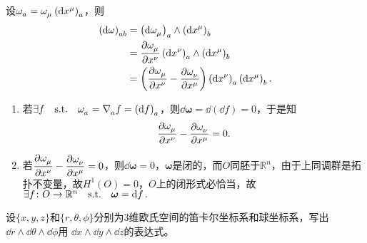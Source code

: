 \begin{xiti}
	\begin{zm}
		设$\tensor{\omega}{_a} = \tensor{\omega}{_\mu} \tensor{\left(\dd{x^\mu}\right)}{_a} $，则
		\begin{align*}
		\tensor{\left(\dd{\omega}\right)}{_{ab}} &= \tensor{\left( \dd{\tensor{\omega}{_\mu}} \right)}{_a} \wedge \tensor{\left(\dd{x^\mu}\right)}{_{b}}\\
		&= \pdv{\tensor{\omega}{_\mu}}{x^\nu} \tensor{\left(\dd{x^\nu}\right)}{_a} \wedge \tensor{\left(\dd{x^\mu}\right)}{_b}\\
		&= \left( \pdv{\tensor{\omega}{_\mu}}{x^\nu} - \pdv{\tensor{\omega}{_\nu}}{x^\mu} \right) \tensor{\left(\dd{x^\nu}\right)}{_a} \tensor{\left(\dd{x^\mu}\right)}{_b}.
		\end{align*}
		\begin{enumerate}
			\item 若$\exists f\qq{s.t.} \tensor{\omega}{_a} = \Nabla{a} f=\tensor{\left(\dd{f}\right)}{_a} $，则$\dd{\bm{\omega}} = \dd(\dd{f})=0 $，于是知\[\pdv{\tensor{\omega}{_\mu}}{x^\nu} - \pdv{\tensor{\omega}{_\nu}}{x^\mu}=0. \]
			\item 若$\displaystyle \pdv{\tensor{\omega}{_\mu}}{x^\nu} - \pdv{\tensor{\omega}{_\nu}}{x^\mu}=0 $，则$\dd{\bm{\omega}}=0 $，$\bm{\omega}$是闭的，而$O$同胚于$\mathbb{R}^n$，由于上同调群是拓扑不变量，故$H^1 (O)={0} $，$O$上的闭形式必恰当，故$\exists f\colon O\rightarrow \mathbb{R}^n \qq{s.t.} \bm{\omega} = \dd{f}. $
		\end{enumerate}
	\end{zm}

	\item 设$ \{ x,y,z \} $和$\{r,\theta,\phi \} $分别为3维欧氏空间的笛卡尔坐标系和球坐标系，写出$ \dd{r} \wedge \dd{\theta} \wedge \dd{\phi} $用 $\dd{x} \wedge \dd{y} \wedge \dd{z} $的表达式。


\end{xiti}
